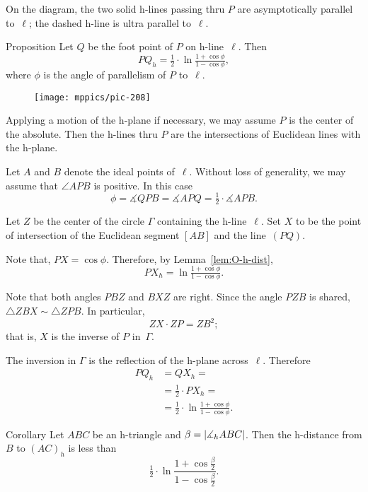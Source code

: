 On the diagram, the two solid h-lines passing thru $P$ are asymptotically parallel to~$\ell$;
the dashed h-line is ultra parallel to~$\ell$.








\begin{thm}{Proposition}\label{prop:angle-parallelism}
Let $Q$ be the foot point of $P$ on h-line~$\ell$.
Then
$$PQ_h=\tfrac12\cdot\ln \tfrac{1+\cos\phi}{1-\cos\phi},$$
where $\phi$ is the angle of parallelism of $P$ to~$\ell$.

\end{thm}

\begin{wrapfigure}{o}{50mm}
\vskip-6mm
\centering
\texttt{[image: mppics/pic-208]}
\end{wrapfigure}


 Applying a motion of the h-plane if necessary,
we may assume $P$ is the center of the absolute.
Then the h-lines thru $P$ are the intersections of Euclidean lines with the h-plane.

Let $A$ and $B$ denote the ideal points of~$\ell$.
Without loss of generality, we may assume that $\angle APB$ 
is positive.
In this case 
$$\phi=\measuredangle QPB=\measuredangle APQ=\tfrac12 \cdot\measuredangle APB.$$

Let $Z$ be the center of the circle $\Gamma$ containing the h-line~$\ell$.
Set $X$ to be the point of intersection of the Euclidean segment $[AB]$ and the line~$(PQ)$.

Note that, $PX=\cos\phi$.
Therefore, by Lemma~\ref{lem:O-h-dist},
$$PX_h=\ln \tfrac{1+\cos\phi}{1-\cos\phi}.$$

Note that both angles $PBZ$ and $BXZ$ are right.
Since the angle $PZB$ is shared, $\triangle ZBX\sim \triangle ZPB$.
In particular, 
$$ZX\cdot ZP=ZB^2;$$
that is, $X$ is the inverse of $P$ in~$\Gamma$.

The inversion in $\Gamma$ is the reflection of the h-plane across~$\ell$. 
Therefore
\begin{align*}
PQ_h&=QX_h=
\\
&=\tfrac12\cdot PX_h=
\\
&=\tfrac12\cdot\ln \tfrac{1+\cos\phi}{1-\cos\phi}.
\end{align*}
\qedsf

\begin{thm}{Corollary}\label{cor:angle-parallelism}
Let $ABC$ be an h-triangle and $\beta\z=|\measuredangle_h ABC|$.
Then the h-distance from $B$ to $(AC)_h$ is less than
\[\tfrac12\cdot\ln \frac{1+\cos\tfrac\beta2}{1-\cos\tfrac\beta2}.\]

\end{thm}

